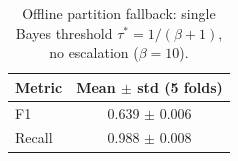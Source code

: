 \begin{table}[!t]
\centering
\caption{Offline partition fallback: single Bayes threshold $\tau^\ast{=}1/(\beta{+}1)$, no escalation ($\beta{=}10$).}
\label{tab:partitionfallback}
\begin{tabular}{lc}
\toprule
Metric & Mean $\pm$ std (5 folds) \\
\midrule
F1 & 0.639 $\pm$ 0.006 \\
Recall & 0.988 $\pm$ 0.008 \\
\bottomrule
\end{tabular}
\end{table}
